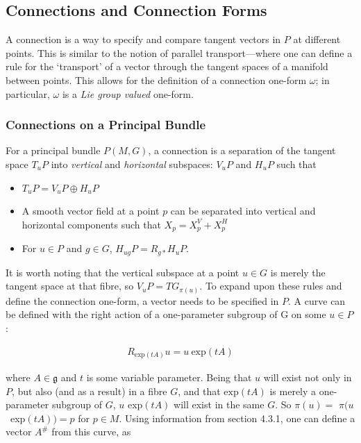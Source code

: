 \documentclass[fleqn, twocolumn, 10pt]{article}
\begin{document}

\subsection{Connections and Connection Forms}

A connection is a way to specify and compare tangent vectors in $P$ at different points. This is similar to the notion of parallel transport---where one can define a rule for the `transport' of a vector through the tangent spaces of a manifold between points. This allows for the definition of a connection one-form $\omega$; in particular, $\omega$ is a \textit{Lie group valued} one-form. 

\subsubsection{Connections on a Principal Bundle}

For a principal bundle $P(M, G)$, a connection is a separation of the tangent space $T_uP$ into \textit{vertical} and \textit{horizontal} subspaces: $V_uP$ and $H_uP$ such that

\begin{itemize}
\item $T_uP = V_uP \oplus H_uP$
\item A smooth vector field at a point $p$ can be separated into vertical and horizontal components such that $X_p = X^V_p + X^H_p$
\item For $u \in P$ and $g \in G$, $H_{ug}P = R_{g*}H_uP$.
\end{itemize} 
It is worth noting that the vertical subspace at a point $u \in G$ is merely the tangent space at that fibre, so $V_uP = TG_{\pi(u)}$. To expand upon these rules and define the connection one-form, a vector needs to be specified in $P$. A curve can be defined with the right action of a one-parameter subgroup of G on some $u \in P$:

\begin{ceqn}
\begin{align*}
R_{\text{exp}(tA)}u = u\:\text{exp}(tA)
\end{align*}
\end{ceqn}
where $A \in \mathfrak{g}$ and $t$ is some variable parameter. Being that $u$ will exist not only in $P$, but also (and as a result) in a fibre $G$, and that $\text{exp}(tA)$ is merely a one-parameter subgroup of $G$, $u$ exp$(tA)$ will exist in the same $G$. So $\pi(u) =$ \mbox{$\pi(u$ exp$(tA)) = p$} for $p \in M$. Using information from section 4.3.1, one can define a vector $A^\#$ from this curve, as
\end{document}
